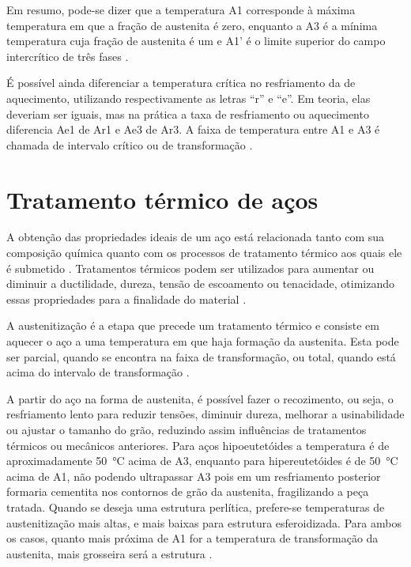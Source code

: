 \documentclass[brazil,tese,epusp]{usp}
\begin{document}
Em resumo, pode-se dizer que a temperatura A1 corresponde à máxima temperatura em que a fração de austenita é zero, enquanto a A3 é a mínima temperatura cuja fração de austenita é um e A1' é o limite superior do campo intercrítico de três fases \cite{Honeycombe1982}.

É possível ainda diferenciar a temperatura crítica no resfriamento da de aquecimento, utilizando respectivamente as letras ``r'' e ``e''. Em teoria, elas deveriam ser iguais, mas na prática a taxa de resfriamento ou aquecimento diferencia Ae1 de Ar1 e Ae3 de Ar3. A faixa de temperatura entre A1 e A3 é chamada de intervalo crítico ou de transformação \cite{Digges1960}.

\section{Tratamento térmico de aços}

A obtenção das propriedades ideais de um aço está relacionada tanto com sua composição química quanto com os processos de tratamento térmico aos quais ele é submetido \cite{Totten2006}. Tratamentos térmicos podem ser utilizados para aumentar ou diminuir a ductilidade, dureza, tensão de escoamento ou tenacidade, otimizando essas propriedades para a finalidade do material \cite{Silva2010}.

A austenitização é a etapa que precede um tratamento térmico e consiste em aquecer o aço a uma temperatura em que haja formação da austenita. Esta pode ser parcial, quando se encontra na faixa de transformação, ou total, quando está acima do intervalo de transformação \cite{ASM1991}.

A partir do aço na forma de austenita, é possível fazer o recozimento, ou seja, o resfriamento lento para reduzir tensões, diminuir dureza, melhorar a usinabilidade ou ajustar o tamanho do grão, reduzindo assim influências de tratamentos térmicos ou mecânicos anteriores. Para aços hipoeutetóides a temperatura é de aproximadamente \SI{50}{\celsius} acima de A3, enquanto para hipereutetóides é de \SI{50}{\celsius} acima de A1, não podendo ultrapassar A3 pois em um resfriamento posterior formaria cementita nos contornos de grão da austenita, fragilizando a peça tratada. Quando se deseja uma estrutura perlítica, prefere-se temperaturas de austenitização mais altas, e mais baixas para estrutura esferoidizada. Para ambos os casos, quanto mais próxima de A1 for a temperatura de transformação da austenita, mais grosseira será a estrutura .
\end{document}
